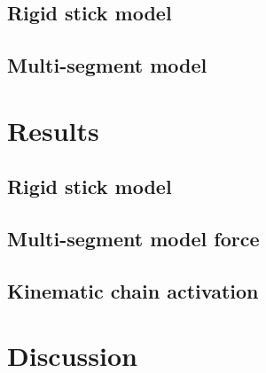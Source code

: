 \documentclass[floats,floatfix,showpacs,amssymb,prd,twocolumn,superscriptaddress,nofootinbib]{revtex4-1}
\begin{document}
\subsection{Rigid stick model}


\subsection{Multi-segment model}


\section{Results}
\label{sec:results}

\subsection{Rigid stick model}

\subsection{Multi-segment model force}

\subsection{Kinematic chain activation}

\section{Discussion}
\label{sec:discussion}




\end{document}
